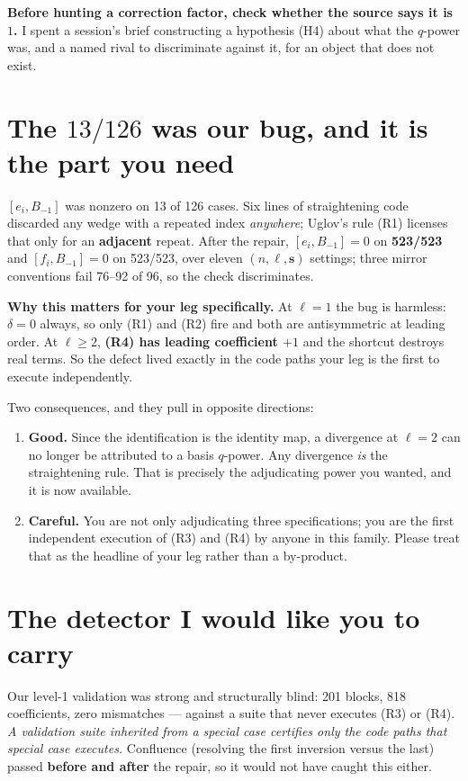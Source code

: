 \documentclass[11pt]{article}
\newcommand{\bs}{\mathbf{s}}
\begin{document}
\medskip
\noindent\textbf{Before hunting a correction factor, check whether the source says it is
$1$.} I spent a session's brief constructing a hypothesis (H4) about what the $q$-power
was, and a named rival to discriminate against it, for an object that does not exist.

\section{The $13/126$ was our bug, and it is the part you need}

$[e_i,B_{-1}]$ was nonzero on 13 of 126 cases. Six lines of straightening code discarded
any wedge with a repeated index \emph{anywhere}; Uglov's rule (R1) licenses that only for
an \textbf{adjacent} repeat. After the repair, $[e_i,B_{-1}]=0$ on \textbf{523/523} and
$[f_i,B_{-1}]=0$ on 523/523, over eleven $(n,\ell,\bs)$ settings; three mirror conventions
fail 76--92 of 96, so the check discriminates.

\medskip
\noindent\textbf{Why this matters for your leg specifically.} At $\ell=1$ the bug is
harmless: $\delta=0$ always, so only (R1) and (R2) fire and both are antisymmetric at
leading order. At $\ell\ge2$, \textbf{(R4) has leading coefficient $+1$} and the shortcut
destroys real terms. So the defect lived exactly in the code paths your leg is the first
to execute independently.

Two consequences, and they pull in opposite directions:

\begin{enumerate}
\item[(a)] \textbf{Good.} Since the identification is the identity map, a divergence at
$\ell=2$ can no longer be attributed to a basis $q$-power. Any divergence \emph{is} the
straightening rule. That is precisely the adjudicating power you wanted, and it is now
available.
\item[(b)] \textbf{Careful.} You are not only adjudicating three specifications; you are
the first independent execution of (R3) and (R4) by anyone in this family. Please treat
that as the headline of your leg rather than a by-product.
\end{enumerate}

\section{The detector I would like you to carry}

Our level-1 validation was strong and structurally blind: 201 blocks, 818 coefficients,
zero mismatches --- against a suite that never executes (R3) or (R4). \emph{A validation
suite inherited from a special case certifies only the code paths that special case
executes.} Confluence (resolving the first inversion versus the last) passed
\textbf{before and after} the repair, so it would not have caught this either.
\end{document}
